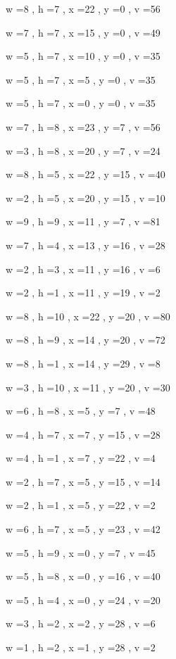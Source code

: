 \documentclass[11pt]{article}
\begin{document}
w =8 , h =7 , x =22 , y =0 , v =56
\par
w =7 , h =7 , x =15 , y =0 , v =49
\par
w =5 , h =7 , x =10 , y =0 , v =35
\par
w =5 , h =7 , x =5 , y =0 , v =35
\par
w =5 , h =7 , x =0 , y =0 , v =35
\par
w =7 , h =8 , x =23 , y =7 , v =56
\par
w =3 , h =8 , x =20 , y =7 , v =24
\par
w =8 , h =5 , x =22 , y =15 , v =40
\par
w =2 , h =5 , x =20 , y =15 , v =10
\par
w =9 , h =9 , x =11 , y =7 , v =81
\par
w =7 , h =4 , x =13 , y =16 , v =28
\par
w =2 , h =3 , x =11 , y =16 , v =6
\par
w =2 , h =1 , x =11 , y =19 , v =2
\par
w =8 , h =10 , x =22 , y =20 , v =80
\par
w =8 , h =9 , x =14 , y =20 , v =72
\par
w =8 , h =1 , x =14 , y =29 , v =8
\par
w =3 , h =10 , x =11 , y =20 , v =30
\par
w =6 , h =8 , x =5 , y =7 , v =48
\par
w =4 , h =7 , x =7 , y =15 , v =28
\par
w =4 , h =1 , x =7 , y =22 , v =4
\par
w =2 , h =7 , x =5 , y =15 , v =14
\par
w =2 , h =1 , x =5 , y =22 , v =2
\par
w =6 , h =7 , x =5 , y =23 , v =42
\par
w =5 , h =9 , x =0 , y =7 , v =45
\par
w =5 , h =8 , x =0 , y =16 , v =40
\par
w =5 , h =4 , x =0 , y =24 , v =20
\par
w =3 , h =2 , x =2 , y =28 , v =6
\par
w =1 , h =2 , x =1 , y =28 , v =2
\par
\newpage
\end{document}
